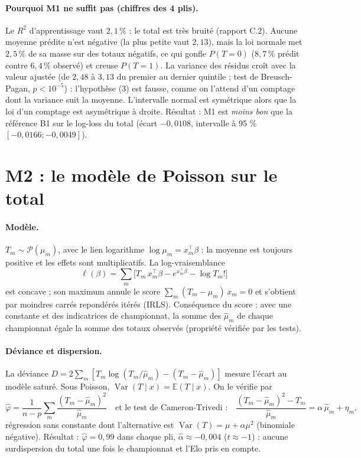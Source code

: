 \paragraph{Pourquoi M1 ne suffit pas (chiffres des 4 plis).} Le \(R^2\) d'apprentissage vaut
\(2{,}1\,\%\) : le total est très bruité (rapport C.2). Aucune moyenne prédite n'est négative (la plus
petite vaut \(2{,}13\)), mais la loi normale met \(2{,}5\,\%\) de sa masse sur des totaux négatifs, ce
qui gonfle \(P(T = 0)\) (\(8{,}7\,\%\) prédit contre \(6{,}4\,\%\) observé) et creuse \(P(T = 1)\). La
variance des résidus croît avec la valeur ajustée (de \(2{,}48\) à \(3{,}13\) du premier au dernier
quintile ; test de Breusch-Pagan, \(p < 10^{-5}\)) : l'hypothèse (3) est fausse, comme on l'attend
d'un comptage dont la variance suit la moyenne. L'intervalle normal est symétrique alors que la loi
d'un comptage est asymétrique à droite. Résultat : M1 est \emph{moins bon} que la référence B1 sur
le log-loss du total (écart \(-0{,}0108\), intervalle à 95 \% \([-0{,}0166 ; -0{,}0049]\)).

\section{M2 : le modèle de Poisson sur le total}
\label{sec:m2}

\paragraph{Modèle.} \(T_m \sim \mathcal{P}(\mu_m)\), avec le lien logarithme
\(\log \mu_m = x_m^\top\beta\) : la moyenne est toujours positive et les effets sont
multiplicatifs. La log-vraisemblance
\[
  \ell(\beta) = \sum_m \big[T_m\, x_m^\top\beta - e^{x_m^\top\beta} - \log T_m!\big]
\]
est concave ; son maximum annule le score \(\sum_m (T_m - \mu_m)\, x_m = 0\) et s'obtient par
moindres carrés repondérés itérés (IRLS). Conséquence du score : avec une constante et des
indicatrices de championnat, la somme des \(\hat\mu_m\) de chaque championnat égale la somme des
totaux observés (propriété vérifiée par les tests).

\paragraph{Déviance et dispersion.} La déviance \(D = 2 \sum_m [T_m \log(T_m/\hat\mu_m) - (T_m -
\hat\mu_m)]\) mesure l'écart au modèle saturé. Sous Poisson, \(\operatorname{Var}(T \mid x) =
\mathbb{E}(T \mid x)\). On le vérifie par
\[
  \hat\varphi = \frac{1}{n - p} \sum_m \frac{(T_m - \hat\mu_m)^2}{\hat\mu_m}
  \quad\text{et le test de Cameron-Trivedi :}\quad
  \frac{(T_m - \hat\mu_m)^2 - T_m}{\hat\mu_m} = \alpha\, \hat\mu_m + \eta_m ,
\]
régression sans constante dont l'alternative est \(\operatorname{Var}(T) = \mu + \alpha\mu^2\)
(binomiale négative). Résultat : \(\hat\varphi = 0{,}99\) dans chaque pli, \(\hat\alpha \approx
-0{,}004\) (\(t \approx -1\)) : aucune surdispersion du total une fois le championnat et l'Elo pris
en compte.

